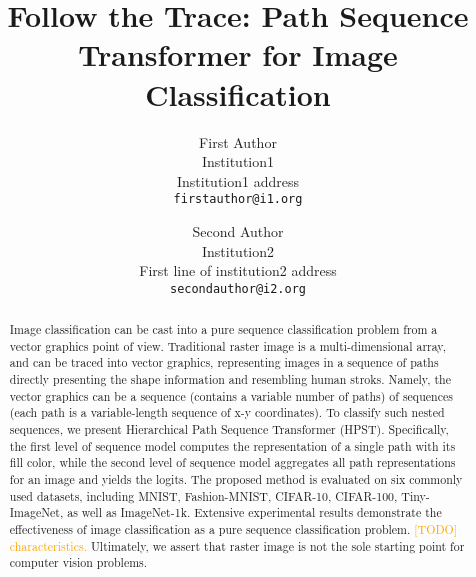 \documentclass[10pt,twocolumn,letterpaper]{article}
\begin{document}
\title{Follow the Trace: Path Sequence Transformer for Image Classification}

\author{First Author\\
Institution1\\
Institution1 address\\
{\tt\small firstauthor@i1.org}
\and
Second Author\\
Institution2\\
First line of institution2 address\\
{\tt\small secondauthor@i2.org}
}
\maketitle

\begin{abstract}
    Image classification can be cast into a pure sequence classification
    problem from a vector graphics point of view.
    Traditional raster image is a multi-dimensional array, and
    can be traced into vector graphics, representing
    images in a sequence of paths directly presenting the shape information
    and resembling human stroks.
    Namely, the vector graphics can be a sequence (contains a
    variable number of paths) of sequences (each path is a variable-length
    sequence of x-y coordinates).
    To classify such nested sequences, we present Hierarchical Path Sequence
    Transformer (HPST).
    Specifically, the first level of sequence model computes the representation
    of a single path with its fill color, while the second level of sequence
    model aggregates all path representations for an image and yields
    the logits.
    The proposed method is evaluated on six commonly used datasets, including
    MNIST, Fashion-MNIST, CIFAR-10, CIFAR-100, Tiny-ImageNet, as well as ImageNet-1k.
    Extensive experimental results demonstrate the effectiveness of image
    classification as a pure sequence classification problem.
    \textcolor{orange}{[TODO] characteristics.}
    Ultimately, we assert that raster image is not the sole starting point
    for computer vision problems.
\end{abstract}
\end{document}
